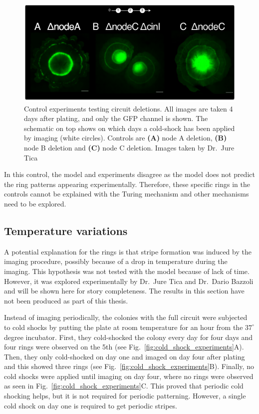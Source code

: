 \begin{figure}[H] %
    \centering
    \begin{adjustbox}{center}
        \includegraphics[width=1\textwidth]{chapters/Chapter 3/experimental_node_dele} %
    \end{adjustbox}
    \caption{Control experiments testing circuit deletions. All images are taken 4 days after plating, and only the GFP channel is shown. The schematic on top shows on which days a cold-shock has been applied by imaging (white circles). Controls are \textbf{(A)} node A deletion, \textbf{(B)} node B deletion and \textbf{(C)} node C deletion. Images taken by Dr.~Jure Tica}
    \label{fig:experimental_node_dele}
\end{figure}

In this control, the model and experiments disagree as the model does not predict the ring patterns appearing experimentally.
Therefore, these specific rings in the controls cannot be explained with the Turing mechanism and other mechanisms need to be explored.
\subsection{Temperature variations}
A potential explanation for the rings is that stripe formation was induced by the imaging procedure, possibly because of a drop in temperature during the imaging.
This hypothesis was not tested with the model because of lack of time.
However, it was explored experimentally by Dr.~Jure Tica and Dr.~Dario Bazzoli and will be shown here for story completeness.
The results in this section have not been produced as part of this thesis.

Instead of imaging periodically, the colonies with the full circuit were subjected to cold shocks by putting the plate at room temperature for an hour from the $37^{\circ}$ degree incubator.
First, they cold-shocked the colony every day for four days and four rings were observed on the 5th (see Fig.~\ref{fig:cold_shock_experiments}A).
Then, they only cold-shocked on day one and imaged on day four after plating and this showed three rings (see Fig.~\ref{fig:cold_shock_experiments}B).
Finally, no cold shocks were applied until imaging on day four, where no rings were observed as seen in Fig.~\ref{fig:cold_shock_experiments}C.
This proved that periodic cold shocking helps, but it is not required for periodic patterning. However, a single cold shock on day one is required to get periodic stripes.



